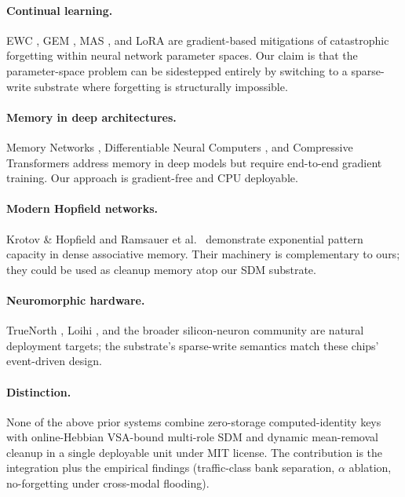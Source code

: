 \documentclass[11pt,a4paper]{article}
\begin{document}
\paragraph{Continual learning.}  EWC
\cite{kirkpatrick2017overcoming}, GEM \cite{lopez2017gradient},
MAS \cite{aljundi2018memory}, and LoRA \cite{hu2022lora} are
gradient-based mitigations of catastrophic forgetting within neural
network parameter spaces.  Our claim is that the parameter-space
problem can be sidestepped entirely by switching to a sparse-write
substrate where forgetting is structurally impossible.

\paragraph{Memory in deep architectures.}  Memory Networks
\cite{sukhbaatar2015end}, Differentiable Neural Computers
\cite{graves2016hybrid}, and Compressive Transformers
\cite{rae2020compressive} address memory in deep models but require
end-to-end gradient training.  Our approach is gradient-free and CPU
deployable.

\paragraph{Modern Hopfield networks.}  Krotov \& Hopfield
\cite{krotov2016dense} and Ramsauer et al.\ \cite{ramsauer2020hopfield}
demonstrate exponential pattern capacity in dense associative memory.
Their machinery is complementary to ours;  they could be used as
cleanup memory atop our SDM substrate.

\paragraph{Neuromorphic hardware.}  TrueNorth
\cite{merolla2014million}, Loihi \cite{davies2018loihi}, and the
broader silicon-neuron community \cite{indiveri2011neuromorphic} are
natural deployment targets;  the substrate's sparse-write semantics
match these chips' event-driven design.

\paragraph{Distinction.}  None of the above prior systems combine
zero-storage computed-identity keys with online-Hebbian VSA-bound
multi-role SDM and dynamic mean-removal cleanup in a single deployable
unit under MIT license.  The contribution is the integration plus the
empirical findings (traffic-class bank separation, $\alpha$ ablation,
no-forgetting under cross-modal flooding).
\end{document}
